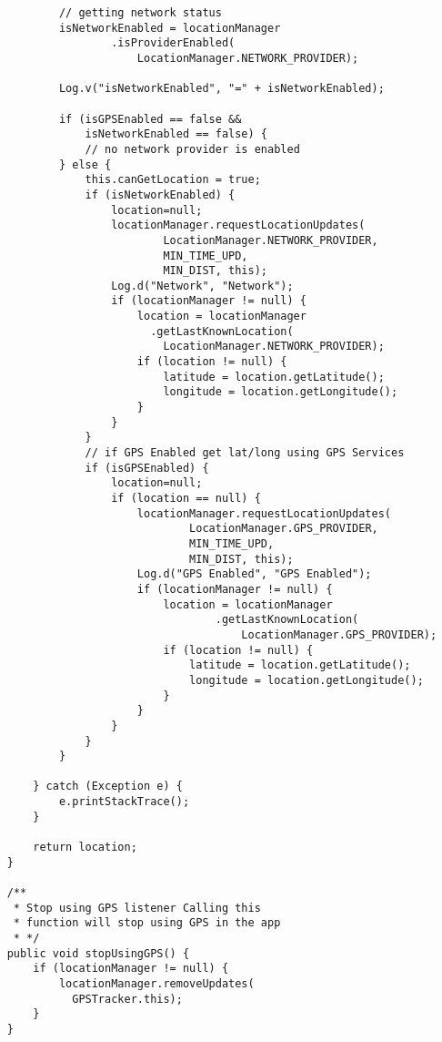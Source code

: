 \documentclass[conference]{IEEEtran}
\begin{document}
\begin{lstlisting}
            // getting network status
            isNetworkEnabled = locationManager
                    .isProviderEnabled(
                        LocationManager.NETWORK_PROVIDER);

            Log.v("isNetworkEnabled", "=" + isNetworkEnabled);

            if (isGPSEnabled == false && 
                isNetworkEnabled == false) {
                // no network provider is enabled
            } else {
                this.canGetLocation = true;
                if (isNetworkEnabled) {
                    location=null;
                    locationManager.requestLocationUpdates(
                            LocationManager.NETWORK_PROVIDER,
                            MIN_TIME_UPD,
                            MIN_DIST, this);
                    Log.d("Network", "Network");
                    if (locationManager != null) {
                        location = locationManager
                          .getLastKnownLocation(
                            LocationManager.NETWORK_PROVIDER);
                        if (location != null) {
                            latitude = location.getLatitude();
                            longitude = location.getLongitude();
                        }
                    }
                }
                // if GPS Enabled get lat/long using GPS Services
                if (isGPSEnabled) {
                    location=null;
                    if (location == null) {
                        locationManager.requestLocationUpdates(
                                LocationManager.GPS_PROVIDER,
                                MIN_TIME_UPD,
                                MIN_DIST, this);
                        Log.d("GPS Enabled", "GPS Enabled");
                        if (locationManager != null) {
                            location = locationManager
                                    .getLastKnownLocation(
                                        LocationManager.GPS_PROVIDER);
                            if (location != null) {
                                latitude = location.getLatitude();
                                longitude = location.getLongitude();
                            }
                        }
                    }
                }
            }

        } catch (Exception e) {
            e.printStackTrace();
        }

        return location;
    }

    /**
     * Stop using GPS listener Calling this 
     * function will stop using GPS in the app
     * */
    public void stopUsingGPS() {
        if (locationManager != null) {
            locationManager.removeUpdates(
              GPSTracker.this);
        }
    }


\end{lstlisting}
\end{document}
